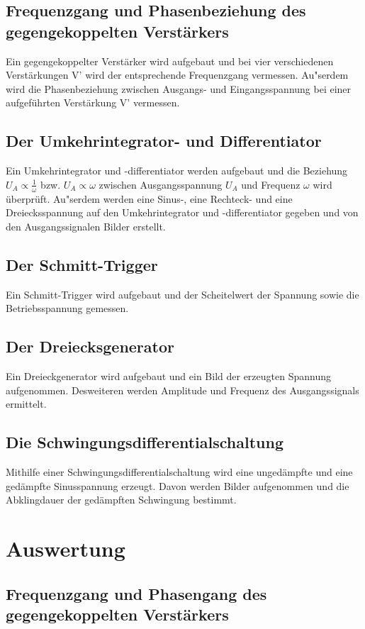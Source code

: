 \documentclass[]{scrartcl}
\let\oldsection\section
\renewcommand\section{\clearpage\oldsection}
\begin{document}
\subsection{Frequenzgang und Phasenbeziehung des gegengekoppelten Verstärkers}
Ein gegengekoppelter Verstärker wird aufgebaut und bei vier verschiedenen Verstärkungen V' wird der entsprechende Frequenzgang vermessen. Au"serdem wird die Phasenbeziehung zwischen Ausgangs- und Eingangsspannung bei einer aufgeführten Verstärkung V' vermessen.

\subsection{Der Umkehrintegrator- und Differentiator}
Ein Umkehrintegrator und -differentiator werden aufgebaut und die Beziehung $U_A\propto\frac{1}{\omega}$ bzw. $U_A\propto\omega$ zwischen Ausgangsspannung $U_A$ und Frequenz $\omega$ wird überprüft. Au"serdem werden eine Sinus-, eine Rechteck- und eine Dreiecksspannung auf den Umkehrintegrator und -differentiator gegeben und von den Ausgangssignalen Bilder erstellt.

\subsection{Der Schmitt-Trigger}
Ein Schmitt-Trigger wird aufgebaut und der Scheitelwert der Spannung sowie die Betriebsspannung gemessen.

\subsection{Der Dreiecksgenerator}
Ein Dreieckgenerator wird aufgebaut und ein Bild der erzeugten Spannung aufgenommen. Desweiteren werden Amplitude und Frequenz des Ausgangssignals ermittelt.

\subsection{Die Schwingungsdifferentialschaltung}
Mithilfe einer Schwingungsdifferentialschaltung wird eine ungedämpfte und eine gedämpfte Sinusspannung erzeugt. Davon werden Bilder aufgenommen und die Abklingdauer der gedämpften Schwingung bestimmt.

\section{Auswertung}

\subsection{Frequenzgang und Phasengang des gegengekoppelten Verstärkers}
\end{document}
